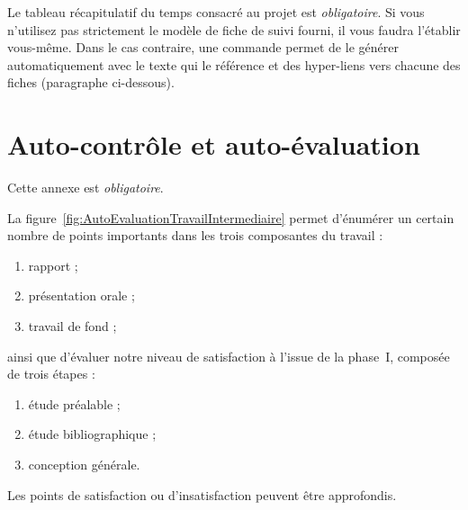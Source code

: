 \documentclass[11pt, french, screen]{report-rd-info}
\begin{document}
Le tableau récapitulatif du temps consacré au projet est \emph{obligatoire}. Si vous n'utilisez pas strictement le modèle de fiche de suivi fourni, il vous faudra l'établir vous-même. Dans le cas contraire, une commande permet de le générer automatiquement avec le texte qui le référence et des hyper-liens vers chacune des fiches (paragraphe ci-dessous).

\printweeksummary

\chapter{Auto-contrôle et auto-évaluation}

Cette annexe est \emph{obligatoire}.

La figure~\ref{fig:AutoEvaluationTravailIntermediaire} permet d'énumérer un certain nombre de points importants dans les trois composantes du travail :
\begin{enumerate}
   \item rapport ;
   \item présentation orale ;
   \item travail de fond ;
\end{enumerate}
ainsi que d'évaluer notre niveau de satisfaction à l'issue de la phase~I, composée de trois étapes :
\begin{enumerate}
	\item étude préalable ;
	\item étude bibliographique ;
	\item conception générale.
\end{enumerate}

Les points de satisfaction ou d'insatisfaction peuvent être approfondis.
\end{document}

